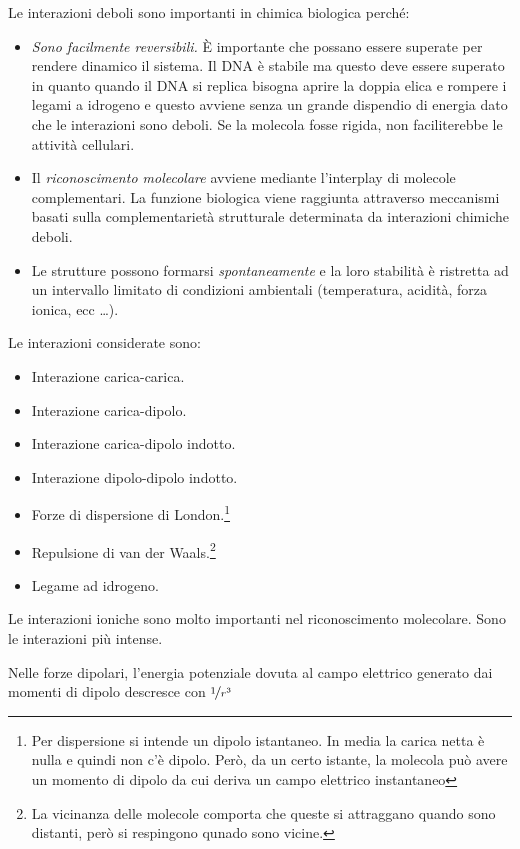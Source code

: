 
Le interazioni deboli sono importanti in chimica biologica perché:
\begin{itemize}
\item
  \emph{Sono facilmente reversibili.} È importante che possano essere superate per rendere dinamico il sistema. Il DNA è stabile ma questo deve essere superato in quanto
  quando il DNA si replica bisogna aprire la doppia elica e rompere i
  legami a idrogeno e questo avviene senza un grande dispendio di
  energia dato che le interazioni sono deboli. Se la molecola fosse rigida, non faciliterebbe le attività cellulari.
\item
  Il \emph{riconoscimento molecolare} avviene mediante l'interplay di molecole
  complementari. La funzione biologica viene raggiunta attraverso
  meccanismi basati sulla complementarietà strutturale determinata da
  interazioni chimiche deboli.
\item
  Le strutture possono formarsi \emph{spontaneamente} e la loro stabilità è
  ristretta ad un intervallo limitato di condizioni ambientali
  (temperatura, acidità, forza ionica, ecc \ldots).
\end{itemize}

Le interazioni considerate sono:
\begin{itemize}
  \item Interazione carica-carica.
  \item Interazione carica-dipolo.
  \item Interazione carica-dipolo indotto.
  \item Interazione dipolo-dipolo indotto.
  \item Forze di dispersione di London.\footnote{Per dispersione si intende un dipolo istantaneo. In media la carica netta è nulla e quindi non c'è dipolo. Però, da un certo istante, la molecola può avere un momento di dipolo da cui deriva un campo elettrico instantaneo}
  \item Repulsione di van der Waals.\footnote{La vicinanza delle molecole comporta che queste si attraggano quando sono distanti, però si respingono qunado sono vicine.}
  \item Legame ad idrogeno.
\end{itemize}

Le interazioni ioniche sono molto importanti nel riconoscimento molecolare. Sono le interazioni più intense.

Nelle forze dipolari, l'energia potenziale dovuta al campo elettrico generato dai momenti di dipolo descresce con $\nicefrac{1}{r^3}$

